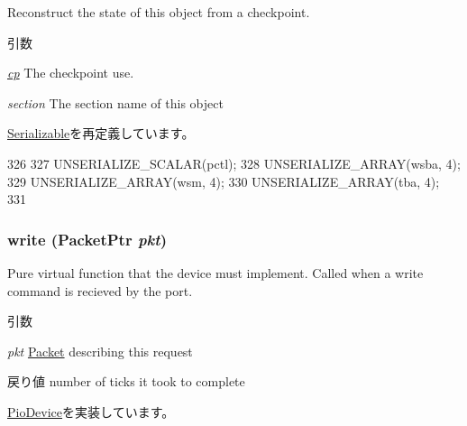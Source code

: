 \label{classMaltaPChip_af22e5d6d660b97db37003ac61ac4ee49}
Reconstruct the state of this object from a checkpoint. 
\begin{DoxyParams}{引数}
\item[{\em \hyperlink{namespacecp}{cp}}]The checkpoint use. \item[{\em section}]The section name of this object \end{DoxyParams}


\hyperlink{classSerializable_af100c4e9feabf3cd918619c88c718387}{Serializable}を再定義しています。


\begin{DoxyCode}
326 {
327     UNSERIALIZE_SCALAR(pctl);
328     UNSERIALIZE_ARRAY(wsba, 4);
329     UNSERIALIZE_ARRAY(wsm, 4);
330     UNSERIALIZE_ARRAY(tba, 4);
331 }
\end{DoxyCode}
\hypertarget{classMaltaPChip_a4cefab464e72b5dd42c003a0a4341802}{
\subsubsection[{write}]{ write ({\bf PacketPtr} {\em pkt})}}
\label{classMaltaPChip_a4cefab464e72b5dd42c003a0a4341802}
Pure virtual function that the device must implement. Called when a write command is recieved by the port. 
\begin{DoxyParams}{引数}
\item[{\em pkt}]\hyperlink{classPacket}{Packet} describing this request \end{DoxyParams}
\begin{DoxyReturn}{戻り値}
number of ticks it took to complete 
\end{DoxyReturn}


\hyperlink{classPioDevice_afe8371668d023bb2516b286e5e399b6f}{PioDevice}を実装しています。


